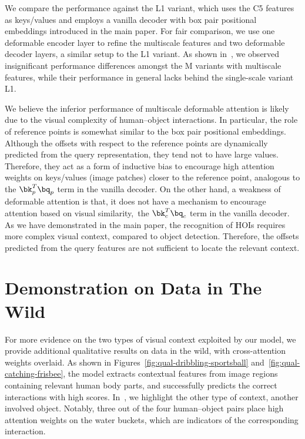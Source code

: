 \documentclass[10pt,twocolumn,letterpaper]{article}
\begin{document}
We compare the performance against the L1 variant, which uses the C5 features as keys/values and employs a vanilla decoder with box pair positional embeddings introduced in the main paper. For fair comparison, we use one deformable encoder layer to refine the multiscale features and two deformable decoder layers, a similar setup to the L1 variant. As shown in~, we observed insignificant performance differences amongst the M variants with multiscale features, while their performance in general lacks behind the single-scale variant L1.

We believe the inferior performance of multiscale deformable attention is likely due to the visual complexity of human--object interactions. In particular, the role of reference points is somewhat similar to the box pair positional embeddings. Although the offsets with respect to the reference points are dynamically predicted from the query representation, they tend not to have large values. Therefore, they act as a form of inductive bias to encourage high attention weights on keys/values (image patches) closer to the reference point, analogous to the $\bk_p^T \bq_p$ term in the vanilla decoder. On the other hand, a weakness of deformable attention is that, it does not have a mechanism to encourage attention based on visual similarity,~\ie the $\bk_c^T \bq_c$ term in the vanilla decoder. As we have demonstrated in the main paper, the recognition of HOIs requires more complex visual context, compared to object detection. Therefore, the offsets predicted from the query features are not sufficient to locate the relevant context.

\section{Demonstration on Data in The Wild}

For more evidence on the two types of visual context exploited by our model, we provide additional qualitative results on data in the wild, with cross-attention weights overlaid. As shown in Figures~\ref{fig:qual-dribbling-sportsball} and~\ref{fig:qual-catching-frisbee}, the model extracts contextual features from image regions containing relevant human body parts, and successfully predicts the correct interactions with high scores. In~, we highlight the other type of context, \ie another involved object. Notably, three out of the four human--object pairs place high attention weights on the water buckets, which are indicators of the corresponding interaction.
\end{document}
